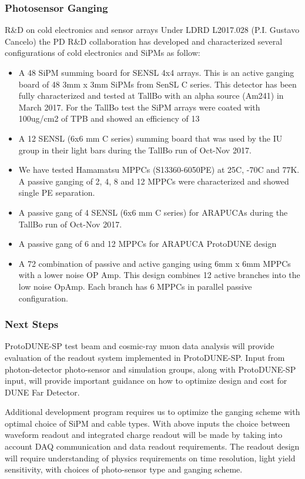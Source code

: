 \subsubsection{Photosensor Ganging}
R\&D on cold electronics and sensor arrays
Under LDRD L2017.028 (P.I. Gustavo Cancelo) the PD R\&D collaboration has developed and characterized several configurations of cold electronics and SiPMs as follow:
\begin{itemize}
\item	A 48 SiPM summing board for SENSL 4x4 arrays. This is an active ganging board of 48 3mm x 3mm SiPMs from SenSL C series. This detector has been fully characterized and tested at TallBo with an alpha source (Am241) in March 2017. For the TallBo test the SiPM arrays were coated with 100ug/cm2 of TPB and showed an efficiency of 13%
\item 	A 12 SENSL (6x6 mm C series) summing board that was used by the IU group in their light bars during the TallBo run of Oct-Nov 2017.
\item 	We have tested Hamamatsu MPPCs (S13360-6050PE) at 25C, -70C and 77K. A passive ganging of 2, 4, 8 and 12 MPPCs were characterized and showed single PE separation.
\item 	A passive gang of 4 SENSL (6x6 mm C series) for ARAPUCAs during the TallBo run of Oct-Nov 2017.
\item 	A passive gang of 6 and 12 MPPCs for ARAPUCA ProtoDUNE design
\item 	A 72 combination of passive and active ganging using 6mm x 6mm MPPCs with a lower noise OP Amp. This design combines 12 active branches into the low noise OpAmp. Each branch has 6 MPPCs in parallel passive configuration.
\end{itemize}



\subsubsection{Next Steps}

ProtoDUNE-SP test beam and cosmic-ray muon data analysis will provide evaluation of the readout system implemented in ProtoDUNE-SP.
Input from photon-detector photo-sensor and simulation groups, along with ProtoDUNE-SP input,  will provide important guidance on
how to optimize design and cost for DUNE Far Detector.

Additional development program requires us to optimize the ganging scheme with optimal choice of SiPM and cable types. With above inputs 
the choice between waveform readout and integrated charge readout will be made by taking into account DAQ communication and data 
readout requirements. The readout design will require understanding of physics requirements on time resolution, light yield 
sensitivity, with choices of photo-sensor type and ganging scheme. 

